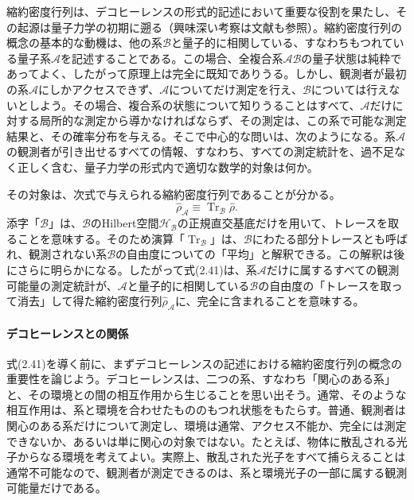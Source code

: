 縮約密度行列は、デコヒーレンスの形式的記述において重要な役割を果たし、その起源は量子力学の初期に遡る\cite{ref060,ref062,ref063}（興味深い考察は文献\cite{ref064}も参照）。縮約密度行列の概念の基本的な動機は、他の系$\mathcal B$と量子的に相関している、すなわちもつれている量子系$\mathcal A$を記述することである。この場合、全複合系$\mathcal{AB}$の量子状態は純粋であってよく、したがって原理上は完全に既知でありうる。しかし、観測者が最初の系$\mathcal A$にしかアクセスできず、$\mathcal A$についてだけ測定を行え、$\mathcal B$については行えないとしよう。その場合、複合系の状態について知りうることはすべて、$\mathcal A$だけに対する局所的な測定から導かなければならず、その測定は、この系で可能な測定結果と、その確率分布を与える。そこで中心的な問いは、次のようになる。系$\mathcal A$の観測者が引き出せるすべての情報、すなわち、すべての測定統計を、過不足なく正しく含む、量子力学の形式内で適切な数学的対象は何か。

その対象は、次式で与えられる縮約密度行列であることが分かる。
\begin{equation}\hat\rho_{\mathcal A}\equiv\operatorname{Tr}_{\mathcal B}\hat\rho.\tag{2.41}\end{equation}
添字「$\mathcal B$」は、$\mathcal B$のHilbert空間$\mathcal H_{\mathcal B}$の正規直交基底だけを用いて、トレースを取ることを意味する。そのため演算「$\operatorname{Tr}_{\mathcal B}$」は、$\mathcal B$にわたる部分トレースとも呼ばれ、観測されない系$\mathcal B$の自由度についての「平均」と解釈できる。この解釈は後にさらに明らかになる。したがって式(2.41)は、系$\mathcal A$だけに属するすべての観測可能量の測定統計が、$\mathcal A$と量子的に相関している$\mathcal B$の自由度の「トレースを取って消去」して得た縮約密度行列$\hat\rho_{\mathcal A}$に、完全に含まれることを意味する。

\hypertarget{srcpage:45}{}\label{srcpage:45}
\paragraph{デコヒーレンスとの関係}
式(2.41)を導く前に、まずデコヒーレンスの記述における縮約密度行列の概念の重要性を論じよう。デコヒーレンスは、二つの系、すなわち「関心のある系」と、その環境との間の相互作用から生じることを思い出そう。通常、そのような相互作用は、系と環境を合わせたもののもつれ状態をもたらす。普通、観測者は関心のある系だけについて測定し、環境は通常、アクセス不能か、完全には測定できないか、あるいは単に関心の対象ではない。たとえば、物体に散乱される光子からなる環境を考えてよい。実際上、散乱された光子をすべて捕らえることは通常不可能なので、観測者が測定できるのは、系と環境光子の一部に属する観測可能量だけである。

